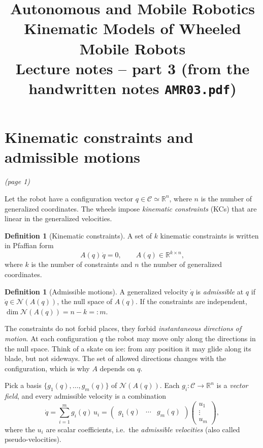 \documentclass[11pt,a4paper]{article}
\title{\textbf{Autonomous and Mobile Robotics}\\[2pt]
\large Kinematic Models of Wheeled Mobile Robots\\[2pt]
\normalsize Lecture notes -- part 3 (from the handwritten notes \texttt{AMR03.pdf})}
\author{}
\date{}
\newcommand{\R}{\mathbb{R}}
\newcommand{\N}{\mathcal{N}}
\newcommand{\dq}{\dot q}
\theoremstyle{definition}
\newtheorem{definition}[theorem]{Definition}
\begin{document}
\maketitle
\tableofcontents

\bigskip

\section{Kinematic constraints and admissible motions}\emph{(page 1)}

Let the robot have a configuration vector $q\in\mathcal{C}\simeq\R^n$, where $n$ is the number of generalized coordinates. The wheels impose \emph{kinematic constraints} (KCs) that are linear in the generalized velocities.

\begin{definition}[Kinematic constraints]
A set of $k$ kinematic constraints is written in Pfaffian form
\[
A(q)\,\dq = 0, \qquad A(q)\in\R^{k\times n},
\]
where $k$ is the number of constraints and $n$ the number of generalized coordinates.
\end{definition}

\begin{definition}[Admissible motions]
A generalized velocity $\dq$ is \emph{admissible} at $q$ if $\dq\in\N(A(q))$, the null space of $A(q)$. If the constraints are independent, $\dim\N(A(q))=n-k=:m$.
\end{definition}

\begin{intuition}
The constraints do not forbid places, they forbid \emph{instantaneous directions of motion}. At each configuration $q$ the robot may move only along the directions in the null space. Think of a skate on ice: from any position it may glide along its blade, but not sideways. The set of allowed directions changes with the configuration, which is why $A$ depends on $q$.
\end{intuition}

Pick a basis $\{g_1(q),\dots,g_m(q)\}$ of $\N(A(q))$. Each $g_i:\mathcal{C}\to\R^n$ is a \emph{vector field}, and every admissible velocity is a combination
\[
\dq=\sum_{i=1}^{m} g_i(q)\,u_i = \begin{pmatrix} g_1(q) & \cdots & g_m(q)\end{pmatrix}\begin{pmatrix}u_1\\ \vdots\\ u_m\end{pmatrix},
\]
where the $u_i$ are scalar coefficients, i.e.\ the \emph{admissible velocities} (also called pseudo-velocities).
\end{document}

